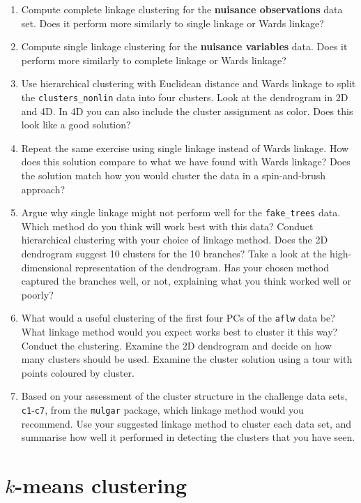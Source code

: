 \documentclass[
  letterpaper,
]{krantz}
\providecommand{\tightlist}{%
  \setlength{\itemsep}{0pt}\setlength{\parskip}{0pt}}\usepackage{longtable,booktabs,array}
\begin{document}
\begin{enumerate}
\def\labelenumi{\arabic{enumi}.}
\tightlist
\item
  Compute complete linkage clustering for the \textbf{nuisance
  observations} data set. Does it perform more similarly to single
  linkage or Wards linkage?
\item
  Compute single linkage clustering for the \textbf{nuisance variables}
  data. Does it perform more similarly to complete linkage or Wards
  linkage?
\item
  Use hierarchical clustering with Euclidean distance and Wards linkage
  to split the \texttt{clusters\_nonlin} data into four clusters. Look
  at the dendrogram in 2D and 4D. In 4D you can also include the cluster
  assignment as color. Does this look like a good solution?
\item
  Repeat the same exercise using single linkage instead of Wards
  linkage. How does this solution compare to what we have found with
  Wards linkage? Does the solution match how you would cluster the data
  in a spin-and-brush approach?
\item
  Argue why single linkage might not perform well for the
  \texttt{fake\_trees} data. Which method do you think will work best
  with this data? Conduct hierarchical clustering with your choice of
  linkage method. Does the 2D dendrogram suggest 10 clusters for the 10
  branches? Take a look at the high-dimensional representation of the
  dendrogram. Has your chosen method captured the branches well, or not,
  explaining what you think worked well or poorly?
\item
  What would a useful clustering of the first four PCs of the
  \texttt{aflw} data be? What linkage method would you expect works best
  to cluster it this way? Conduct the clustering. Examine the 2D
  dendrogram and decide on how many clusters should be used. Examine the
  cluster solution using a tour with points coloured by cluster.\\
\item
  Based on your assessment of the cluster structure in the challenge
  data sets, \texttt{c1}-\texttt{c7}, from the \texttt{mulgar} package,
  which linkage method would you recommend. Use your suggested linkage
  method to cluster each data set, and summarise how well it performed
  in detecting the clusters that you have seen.
\end{enumerate}


\chapter{\texorpdfstring{\(k\)-means
clustering}{k-means clustering}}\label{sec-kmeans}
\end{document}
